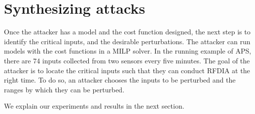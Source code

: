 \section{Synthesizing attacks}
Once the attacker has a model and the cost function designed, the next step is to identify the critical inputs, and the desirable perturbations.
The attacker can run models with the cost functions in a \ac{MILP} solver. 
In the running example of APS, there are 74 inputs collected from two sensors every five minutes.
 The goal of the attacker is to locate the critical inputs such that they can conduct \ac{RFDIA} at the right time.
 To do so, an attacker chooses the inputs to be perturbed and the ranges by which they can be perturbed.  
 
 
 
We explain our experiments and results in the next section. 

